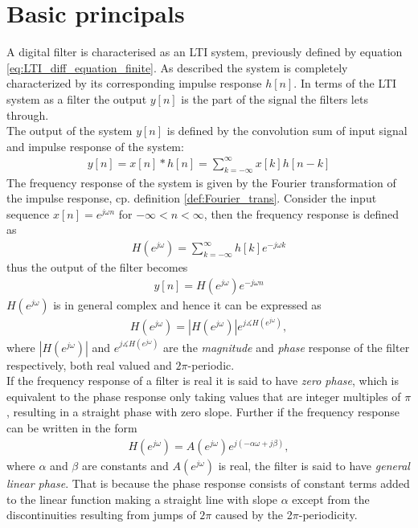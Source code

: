 \section{Basic principals}\label{sec:basic_filter}
A digital filter is characterised as an LTI system, previously defined by equation \eqref{eq:LTI_diff_equation_finite}. As described the system is completely characterized by its corresponding impulse response $h[n]$. In terms of the LTI system as a filter the output $y[n]$ is the part of the signal the filters lets through. \\
The output of the system $y[n]$ is defined by the convolution sum of input signal and impulse response of the system: \cite{DTSP, p. 26}
\begin{align}
y[n] = x[n]*h[n] = \sum_{k=-\infty}^{\infty} x[k]h[n-k]
\end{align}    
The frequency response of the system is given by the Fourier transformation of the impulse response, cp. definition \ref{def:Fourier_trans}. Consider the input sequence $x[n]=e^{j\omega n}$ for $-\infty < n <\infty$, then the frequency response is defined as
\begin{align}\label{eq:freq_res}
H(e^{j\omega})=\sum_{k=-\infty}^{\infty}h[k]e^{-j\omega k}
\end{align}
thus the output of the filter becomes 
\begin{align}
y[n]=H(e^{j\omega})e^{-j\omega n} \label{eq:filter_output}
\end{align}
$H(e^{j\omega})$ is in general complex and hence it can be expressed as
\begin{align}
H(e^{j\omega})=|H(e^{j\omega})|e^{j\measuredangle H(e^{j\omega})},
\end{align}  
where $|H(e^{j\omega})|$ and $e^{j\measuredangle H(e^{j\omega})}$ are the \textit{magnitude} and \textit{phase} response of the filter respectively, both real valued and $2\pi$-periodic.\\ 
If the frequency response of a filter is real it is said to have \textit{zero phase}, which is equivalent to the phase response only taking values that are integer multiples of $\pi$, resulting in a straight phase with zero slope. Further if the frequency response can be written in the form 
\begin{align}\label{eq:lin_pha}
H(e^{j\omega})=A(e^{j\omega})e^{j(-\alpha\omega + j\beta)} ,
\end{align}
where $\alpha$ and $\beta$ are constants and $A(e^{j\omega})$ is real, the filter is said to have \textit{general linear phase}. That is because the phase response consists of constant terms added to the linear function making a straight line with slope $\alpha$ except from the discontinuities resulting from jumps of $2\pi$ caused by the 2$\pi$-periodicity. \\

